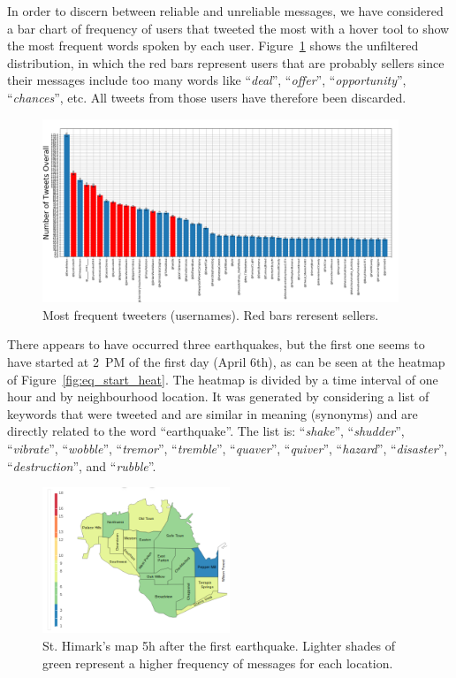 In order to discern between reliable and unreliable messages, we have considered
a bar chart of frequency of users that tweeted the most with a hover tool to
show the most frequent words spoken by each user.
Figure~\ref{fig:most_freq_users} shows the unfiltered distribution, in which the
red bars represent users that are probably sellers since their messages include
too many words like ``\emph{deal}'', ``\emph{offer}'', ``\emph{opportunity}'',
``\emph{chances}'', etc. All tweets from those users have therefore been
discarded.

\begin{figure}[!h]
    \centering
    \includegraphics[width=0.95\textwidth]{figs/q1/most_freq_users.png}
    \caption{Most frequent tweeters (usernames). Red bars reresent sellers.}
    \label{fig:most_freq_users}
\end{figure}

There appears to have occurred three earthquakes, but the first one seems to
have started at 2~PM of the first day (April 6th), as
can be seen at the heatmap of Figure~\ref{fig:eq_start_heat}. The heatmap is
divided by a time interval of one hour and by neighbourhood location. It was
generated by considering a list of keywords that were tweeted and are similar in 
meaning (synonyms) and are directly related to the word ``earthquake''. The list 
is: ``\emph{shake}'', ``\emph{shudder}'', ``\emph{vibrate}'', ``\emph{wobble}'',
``\emph{tremor}'', ``\emph{tremble}'', ``\emph{quaver}'', ``\emph{quiver}'',
``\emph{hazard}'', ``\emph{disaster}'', ``\emph{destruction}'', and
``\emph{rubble}''.

\begin{figure}[!h]
    \centering
    \includegraphics[width=0.50\textwidth]{figs/q1/cond_5h/cond_5h_svg.png}
    \caption{St. Himark's map 5h after the first earthquake. Lighter shades of
    green represent a higher frequency of messages for each location.}
    \label{fig:map_5h}
\end{figure}

